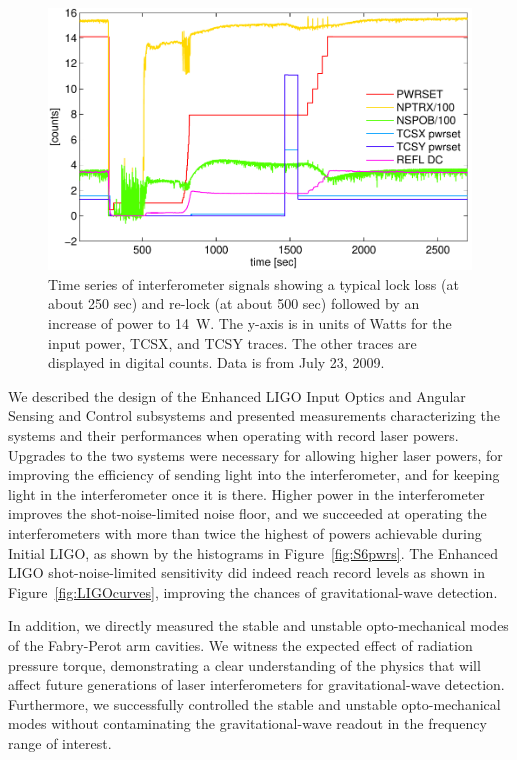 \begin{figure}
\begin{centering}
\includegraphics[width=1.0\columnwidth]{figures/timeseries_ifolocked.pdf}
\caption[Striptool example]{Time series of interferometer signals
  showing a typical lock loss (at about 250 sec) and re-lock (at about
  500 sec) followed by an increase of power to 14~W. The y-axis is in
  units of Watts for the input power, TCSX, and TCSY traces. The other
  traces are displayed in digital counts. Data is from July 23, 2009.}
\label{fig:striptool}
\end{centering}
\end{figure}

We described the design of the Enhanced LIGO Input Optics and Angular
Sensing and Control subsystems and presented measurements
characterizing the systems and their performances when operating with
record laser powers. Upgrades to the two systems were necessary for
allowing higher laser powers, for improving the efficiency of sending
light into the interferometer, and for keeping light in the
interferometer once it is there. Higher power in the interferometer
improves the shot-noise-limited noise floor, and we succeeded at
operating the interferometers with more than twice the highest of
powers achievable during Initial LIGO, as shown by the histograms in
Figure~\ref{fig:S6pwrs}. The Enhanced LIGO shot-noise-limited
sensitivity did indeed reach record levels as shown in
Figure~\ref{fig:LIGOcurves}, improving the chances of gravitational-wave
detection.

In addition, we directly measured the stable and unstable
opto-mechanical modes of the Fabry-Perot arm cavities. We witness
the expected effect of radiation pressure torque, demonstrating a
clear understanding of the physics that will affect future generations
of laser interferometers for gravitational-wave
detection. Furthermore, we successfully controlled the stable and
unstable opto-mechanical modes without contaminating the
gravitational-wave readout in the frequency range of interest.

